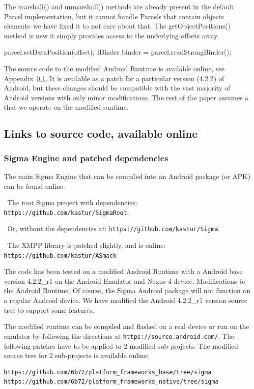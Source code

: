\documentclass[prodmode]{acmlarge}
\begin{document}
The marshall() and unmarshall() methods are already present in the default Parcel implementation, but it cannot handle Parcels that contain objects elements--we have fixed it to not care about that. The getObjectPositions() method is new it simply provides access to the underlying offsets array.

\begin{snippet}
parcel.setDataPosition(offset);
IBinder binder = parcel.readStrongBinder();
\end{snippet}

The source code to the modified Android Runtime is available online, see Appendix~\ref{app:SourceCode}. It is available as a patch for a particular version (4.2.2) of Android, but these changes should be compatible with the vast majority of Android versions with only minor modifications. The rest of the paper assumes a that we operate on the modified runtime.

\subsection{Links to source code, available online}
\label{app:SourceCode}

\subsubsection{Sigma Engine and patched dependencies}
The main Sigma Engine that can be compiled into an Android package (or APK) can be found online.

\noindent~The root Sigma project with dependencies: \verb|https://github.com/kastur/SigmaRoot|.

\noindent~Or, without the dependencies at: \verb|https://github.com/kastur/Sigma|.

\noindent~The XMPP library is patched slightly, and is online: \verb|https://github.com/kastur/ASmack|

The code has been tested on a modified Android Runtime with a Android base version 4.2.2\_r1 on the Android Emulator and Nexus 4 device.
Modifications to the Android Runtime. Of course, the Sigma Android package will not function on a regular Android device. We have modified the Android 4.2.2\_r1 version source tree to support some features.

The modified runtime can be compiled and flashed on a real device or run on the emulator by following the directions at \verb|https://source.android.com/|. The following patches have to be applied to 2 modified sub-projects. The modified source tree for 2 sub-projects is available online:
\begin{Verbatim}
https://github.com/6b72/platform_frameworks_base/tree/sigma
https://github.com/6b72/platform_frameworks_native/tree/sigma
\end{Verbatim}
\end{document}

